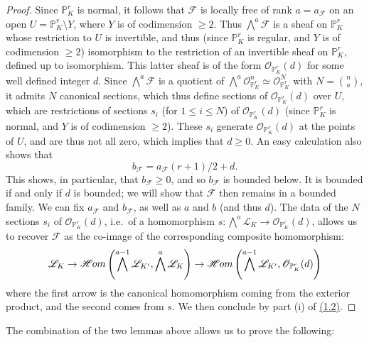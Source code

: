 \documentclass{article}
\newcommand{\oldpage}[1]{\marginpar{\footnotesize$\Big\vert$ \textit{p.~#1}}}
\theoremstyle{definition}
\theoremstyle{definition}
\theoremstyle{definition}
\theoremstyle{definition}
\theoremstyle{remark}
\begin{document}
\begin{proof}
Since \(\mathbb{P}_K^r\) is normal, it follows that \({\mathscr{F}}\) is locally free of rank \(a=a_{\mathscr{F}}\) on an open \(U=\mathbb{P}_K^r\setminus Y\), where \(Y\) is of codimension \(\geqslant 2\).
Thus \(\bigwedge^a{\mathscr{F}}\) is a sheaf on \(\mathbb{P}_K^r\) whose restriction to \(U\) is invertible, and thus (since \(\mathbb{P}_K^r\) is regular, and \(Y\) is of codimension \(\geqslant 2\)) isomorphism to the restriction of an invertible sheaf on \(\mathbb{P}_K^r\), defined up to isomorphism.
This latter sheaf is of the form \({\mathscr{O}}_{\mathbb{P}_K^r}(d)\) for some well defined integer \(d\).
Since \(\bigwedge^a{\mathscr{F}}\) is a quotient of \(\bigwedge^a{\mathscr{O}}_{\mathbb{P}_K^r}^n\simeq{\mathscr{O}}_{\mathbb{P}_K^r}^N\) with \(N=\binom{n}{a}\), it admits \(N\) canonical sections, which thus define sections of \({\mathscr{O}}_{\mathbb{P}_K^r}(d)\) over \(U\), which are restrictions of sections \(s_i\) (for \(1\leqslant i\leqslant N\)) of \({\mathscr{O}}_{\mathbb{P}_K^r}(d)\) (since \(\mathbb{P}_K^r\) is normal, and \(Y\) is of codimension \(\geqslant 2\)).
\oldpage{221-09}These \(s_i\) generate \({\mathscr{O}}_{\mathbb{P}_K^r}(d)\) at the points of \(U\), and are thus not all zero, which implies that \(d\geqslant 0\).
An easy calculation also shows that
\[
  b_{\mathscr{F}} = a_{\mathscr{F}}(r+1)/2 + d.
\]
This shows, in particular, that \(b_{\mathscr{F}}\geqslant 0\), and so \(b_{\mathscr{F}}\) is bounded below.
It is bounded if and only if \(d\) is bounded;
we will show that \({\mathscr{F}}\) then remains in a bounded family.
We can fix \(a_{\mathscr{F}}\) and \(b_{\mathscr{F}}\), as well as \(a\) and \(b\) (and thus \(d\)).
The data of the \(N\) sections \(s_i\) of \({\mathscr{O}}_{\mathbb{P}_K^r}(d)\), i.e.~of a homomorphism \(s\colon\bigwedge^a{\mathscr{L}}_K\to{\mathscr{O}}_{\mathbb{P}_K^r}(d)\), allows us to recover \({\mathscr{F}}\) as the co-image of the corresponding composite homomorphism:
\[
  {\mathscr{L}}_K
  \to \mathscr{H}\kern -.5pt om\left( \bigwedge^{a-1}{\mathscr{L}}_{K'}, \bigwedge^a{\mathscr{L}}_K \right)
  \to \mathscr{H}\kern -.5pt om\left( \bigwedge^{a-1}{\mathscr{L}}_{K'}, {\mathscr{O}}_{\mathbb{P}_K^r}(d) \right)
\]
where the first arrow is the canonical homomorphism coming from the exterior product, and the second comes from \(s\).
We then conclude by part (i) of \protect\hyperlink{fga-3-iv-proposition-1.2}{(1.2)}.
\end{proof}

The combination of the two lemmas above allows us to prove the following:
\end{document}
